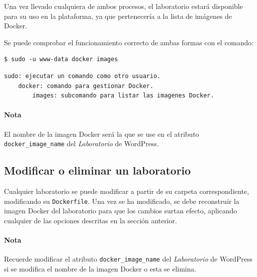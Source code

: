                 Una vez llevado cualquiera de ambos procesos, el laboratorio estará disponible para su uso en la plataforma, ya que pertenecería a la lista de imágenes de Docker.

                Se puede comprobar el funcionamiento correcto de ambas formas con el comando:
                \\

                \begin{lstlisting}[style=bash_style]
    $ sudo -u www-data docker images
                \end{lstlisting}

                \begin{lstlisting}[style=comment_style]
    sudo: ejecutar un comando como otro usuario.
    docker: comando para gestionar Docker.
        images: subcomando para listar las imagenes Docker.
                \end{lstlisting}

                \paragraph{Nota}

                    El nombre de la imagen Docker será la que se use en el atributo \texttt{docker\_image\_name} del \textit{Laboratorio} de WordPress.

        \subsection{Modificar o eliminar un laboratorio}

            Cualquier laboratorio se puede modificar a partir de su carpeta correspondiente, modificando su \texttt{Dockerfile}. Una vez se ha modificado, se debe reconstruir la imagen Docker del laboratorio para que los cambios surtan efecto, aplicando cualquier de las opciones descritas en la sección anterior.

            \paragraph{Nota}

                Recuerde modificar el atributo \texttt{docker\_image\_name} del \textit{Laboratorio} de WordPress si se modifica el nombre de la imagen Docker o esta se elimina.

                \cleardoublepage

            

